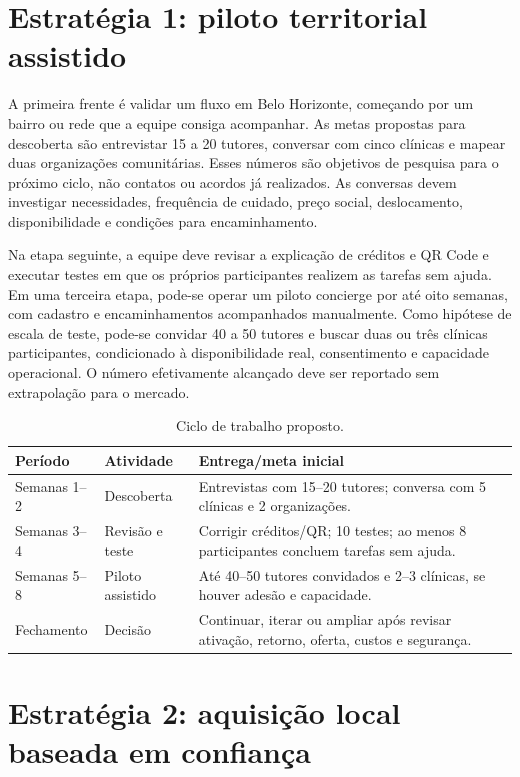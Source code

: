 \documentclass[12pt,a4paper]{article}
\begin{document}
\section{Estratégia 1: piloto territorial assistido}

A primeira frente é validar um fluxo em Belo Horizonte, começando por um bairro ou rede que a equipe consiga acompanhar. As metas propostas para descoberta são entrevistar 15 a 20 tutores, conversar com cinco clínicas e mapear duas organizações comunitárias. Esses números são objetivos de pesquisa para o próximo ciclo, não contatos ou acordos já realizados. As conversas devem investigar necessidades, frequência de cuidado, preço social, deslocamento, disponibilidade e condições para encaminhamento.

Na etapa seguinte, a equipe deve revisar a explicação de créditos e QR Code e executar testes em que os próprios participantes realizem as tarefas sem ajuda. Em uma terceira etapa, pode-se operar um piloto concierge por até oito semanas, com cadastro e encaminhamentos acompanhados manualmente. Como hipótese de escala de teste, pode-se convidar 40 a 50 tutores e buscar duas ou três clínicas participantes, condicionado à disponibilidade real, consentimento e capacidade operacional. O número efetivamente alcançado deve ser reportado sem extrapolação para o mercado.

\begin{table}[htbp]\centering\small
\caption{Ciclo de trabalho proposto.}
\begin{tabularx}{\textwidth}{P{2.1cm}YY}
\toprule\textbf{Período} & \textbf{Atividade} & \textbf{Entrega/meta inicial}\\\midrule
Semanas 1--2 & Descoberta & Entrevistas com 15--20 tutores; conversa com 5 clínicas e 2 organizações.\\
Semanas 3--4 & Revisão e teste & Corrigir créditos/QR; 10 testes; ao menos 8 participantes concluem tarefas sem ajuda.\\
Semanas 5--8 & Piloto assistido & Até 40--50 tutores convidados e 2--3 clínicas, se houver adesão e capacidade.\\
Fechamento & Decisão & Continuar, iterar ou ampliar após revisar ativação, retorno, oferta, custos e segurança.\\
\bottomrule\end{tabularx}\end{table}

\section{Estratégia 2: aquisição local baseada em confiança}
\end{document}
